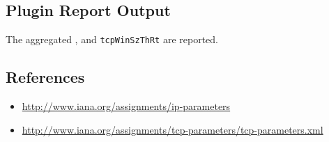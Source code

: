\documentclass[documentation]{subfiles}
\begin{document}


\subsection{Plugin Report Output}
The aggregated {\tt{}}, {\tt{}} and {\tt tcpWinSzThRt} are reported.


%

\subsection{References}
\begin{itemize}
    \item \url{http://www.iana.org/assignments/ip-parameters}
    \item \url{http://www.iana.org/assignments/tcp-parameters/tcp-parameters.xml}
\end{itemize}
\end{document}

